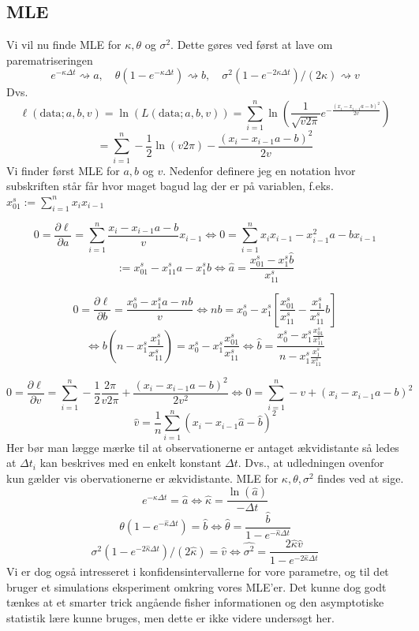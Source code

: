 \documentclass{article}
\theoremstyle{definition}
\theoremstyle{remark}
\newcommand\ens{\Leftrightarrow}
\begin{document}
\subsection{MLE}
Vi vil nu finde MLE for $\kappa, \theta$ og $\sigma^2$. Dette gøres ved først at lave om parematriseringen 
$$ e^{-\kappa\Delta t}\rightsquigarrow a, \quad \theta(1-e^{-\kappa\Delta t})\rightsquigarrow b, \quad \sigma^2(1-e^{-2\kappa\Delta t})/(2\kappa) \rightsquigarrow v$$
Dvs.
$$\ell(\text{data};a,b,v)=\ln(L(\text{data};a,b,v))=\sum_{i=1}^n \ln\left(\frac1{\sqrt{v2\pi}}e^{-\frac{(x_i-x_{i-1}a-b)^2}{2v}}\right)$$
$$=\sum_{i=1}^n-\frac12\ln(v2\pi)-\frac{(x_i-x_{i-1}a-b)^2}{2v}$$
Vi finder først MLE for $a,b$ og $v$. Nedenfor definere jeg en notation hvor subskriften står får hvor maget bagud lag der er på variablen, f.eks. $x_{01}^s:=\sum_{i=1}^nx_ix_{i-1}$

$$0=\frac{\partial \ell}{\partial a}=\sum_{i=1}^n\frac{x_i-x_{i-1}a-b}{v}x_{i-1}\ens0=\sum_{i=1}^n x_ix_{i-1}-x_{i-1}^2a-bx_{i-1}$$
$$:=x^s_{01}-x^s_{11}a-x^s_1b\ens \hat a=\frac{x_{01}^s-x^s_1\hat b}{x^s_{11}}$$

$$0=\frac{\partial \ell}{\partial b}=\frac{x^s_0-x_1^sa-nb}{v}\ens nb = x_0^s-x_1^s\left[ \frac{x_{01}^s}{x_{11}^s}-\frac{x_1^s}{x_{11}^s}b \right]$$
$$\ens b\left(n-x_1^s\frac{x_1^s}{x_{11}^s}\right)=x_0^s-x_1^s\frac{x_{01}^s}{x_{11}^s}\ens \hat b = \frac{x_0^s-x_1^s\frac{x_{01}^s}{x_{11}^s}}{n-x_1^s\frac{x_1^s}{x_{11}^s}}$$

$$0=\frac{\partial \ell}{\partial v}=\sum_{i=1}^n -\frac12\frac{2\pi}{v2\pi}+\frac{(x_i-x_{i-1}a-b)^2}{2v^2}\ens 0=\sum_{i=1}^n -v+(x_i-x_{i-1}a-b)^2$$
$$\hat v = \frac1n\sum_{i=1}^n(x_i-x_{i-1}\hat a-\hat b)^2$$
Her bør man lægge mærke til at observationerne er antaget ækvidistante så ledes at $\Delta t_i$ kan beskrives med en enkelt konstant $\Delta t$. Dvs., at udledningen ovenfor kun gælder vis obervationerne er ækvidistante. 
MLE for $\kappa,\theta,\sigma^2$ findes ved at sige.
$$e^{-\kappa\Delta t}=\hat a\ens \hat \kappa=\frac{\ln(\hat a)}{-\Delta t}$$
$$\theta(1-e^{-\hat \kappa \Delta t})=\hat b\ens \hat \theta =\frac{\hat b}{1-e^{-\hat \kappa\Delta t}}$$
$$\sigma^2(1-e^{-2\hat\kappa\Delta t})/(2\hat\kappa)=\hat v \ens \hat{\sigma^2}=\frac{2\hat\kappa\hat v}{1-e^{-2\hat\kappa\Delta t}}$$
Vi er dog også intresseret i  konfidensintervallerne for vore parametre, og til det bruger et simulations eksperiment omkring vores MLE'er. Det kunne dog godt tænkes at et smarter trick angående fisher informationen og den asymptotiske statistik lære kunne bruges, men dette er ikke videre undersøgt her.
\end{document}
